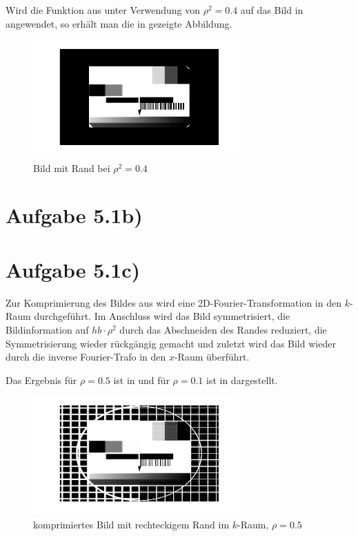 Wird die Funktion aus  unter Verwendung von $ρ^2 = 0.4$ auf das
Bild in  angewendet, so erhält man die in  gezeigte Abbildung.

\begin{figure}[htb]
\centering
  \includegraphics[width=0.7\textwidth,keepaspectratio]{../tmp/eins_a}
  \caption{Bild mit Rand bei $ρ^2 = 0.4$}
  \label{fig:1a}
\end{figure}

\section*{Aufgabe 5.1b)}
\section*{Aufgabe 5.1c)}

Zur Komprimierung des Bildes aus  wird eine 2D-Fourier-Transformation
in den $k$-Raum durchgeführt. Im Anschluss wird das Bild symmetrisiert, die Bildinformation
auf $hb\cdot ρ^2$ durch das Abschneiden des Randes reduziert, die Symmetrisierung wieder
rückgängig gemacht und zuletzt wird das Bild wieder durch die inverse Fourier-Trafo in den
$x$-Raum überführt.

Das Ergebnis für $ρ=0.5$ ist in  und für $ρ=0.1$ ist in  dargestellt.

\begin{figure}[htb]
\centering
  \includegraphics[width=0.7\textwidth,keepaspectratio]{../tmp/eins_c_0_5}
  \caption{komprimiertes Bild mit rechteckigem Rand im $k$-Raum, $ρ=0.5$}
  \label{fig:1c5}
\end{figure}

